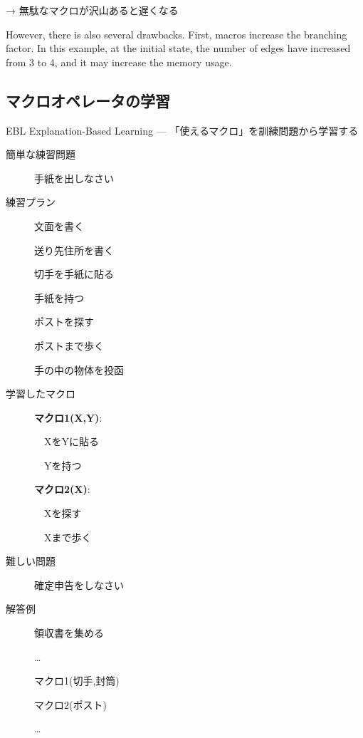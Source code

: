 \begin{alignright}
→ 無駄なマクロが沢山あると遅くなる
\end{alignright}

\begin{resume}
However, there is also several drawbacks.
First, macros increase the branching factor.
In this example, at the initial state,
the number of edges have increased from 3 to 4,
and it may increase the memory usage.
\end{resume}

\subsection{マクロオペレータの学習}
\label{sec-6-6}

EBL Explanation-Based Learning --- 「使えるマクロ」を訓練問題から学習する

\begin{container-fluid}
\begin{row-fluid}
\begin{span4}
\begin{description}
\item[{簡単な練習問題}] 手紙を出しなさい

\item[{練習プラン}] 文面を書く

送り先住所を書く

切手を手紙に貼る

手紙を持つ

ポストを探す

ポストまで歩く

手の中の物体を投函
\end{description}
\end{span4}
\begin{span4}
\begin{description}
\item[{学習したマクロ}] \textbf{マクロ1(X,Y)}:

　XをYに貼る

　Yを持つ

\textbf{マクロ2(X)}:

　Xを探す

　Xまで歩く
\end{description}
\end{span4}
\begin{span4}
\begin{description}
\item[{難しい問題}] 確定申告をしなさい
\item[{解答例}] 領収書を集める

\ldots{}

マクロ1(切手,封筒)

マクロ2(ポスト)

\ldots{}
\end{description}
\end{span4}
\end{row-fluid}
\end{container-fluid}

